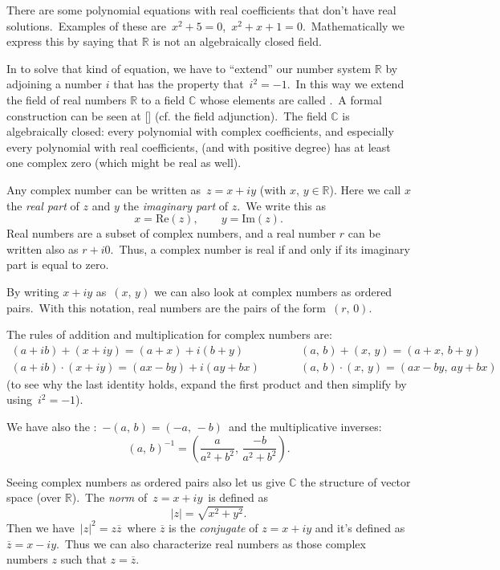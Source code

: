 \documentclass[12pt]{article}
\begin{document}


There are some polynomial equations with real coefficients that don't have real solutions.\, Examples of these are\, $x^2+5=0$,\, $x^2+x+1=0$.\, Mathematically we express this by saying that $\mathbb{R}$ is not an algebraically closed field.

In  to solve that kind of equation, we have to ``extend'' our number system $\mathbb{R}$ by adjoining a number $i$ that has the property that\, $i^2=-1$.\, In this way we extend the field of real numbers $\mathbb{R}$ to a field $\mathbb{C}$ whose elements are called \emph{}.\, A formal construction can be seen at [] (cf. the field adjunction).\, The field $\mathbb{C}$ is algebraically closed: every polynomial with complex coefficients, and especially every polynomial with real coefficients, (and with positive degree) has at least one complex zero (which might be real as well).

Any complex number can be written as\, $z = x+iy$ (with $x,\,y\in\mathbb{R}$). Here we call $x$ the {\em real part}  of $z$ and $y$ the {\em imaginary part} of $z$.\,
We write this as 
$$x=\mbox{Re}(z), \qquad y=\mbox{Im}(z).$$
Real numbers are a subset of complex numbers, and a real number $r$ can be written also as $r+i0$.\, Thus, a complex number is real if and only if its imaginary part is equal to zero.

By writing $x\!+\!iy$ as\, $(x,\,y)$ we can also look at complex numbers as ordered pairs.\, With this notation, real numbers are the pairs of the form\, $(r,\,0)$. 

The rules of addition and multiplication for complex numbers are:
\begin{eqnarray*}
(a+ib)+(x+iy)=(a+x)+i(b+y)&\qquad&(a,\,b)+(x,\,y) = (a+x,\,b+y)\\
(a+ib)\cdot(x+iy)=(ax-by)+i(ay+bx)&\qquad&(a,\,b)\cdot(x,\,y)=(ax-by,\,ay+bx)
\end{eqnarray*}
(to see why the last identity holds, expand the first product and then simplify 
by using\, $i^2 = -1$).

We have also the :\, $-(a,\,b) =
(-a,\,-b)$\, and the multiplicative inverses:
$$(a,\,b)^{-1}=\left(\frac{a}{a^2+b^2},\,\frac{-b}{a^2+b^2}\right).$$

Seeing complex numbers as ordered pairs also let us give $\mathbb{C}$ the structure of vector space (over $\mathbb{R}$).\, The \emph{norm} of\, $z = x+iy$\, is defined as
$$|z| = \sqrt{x^2+y^2}.$$
Then we have\, $|z|^2=z\overline{z}$\, where $\overline{z}$ is the \emph{conjugate} of $z = x+iy$ and it's defined as\, $\overline{z} = x-iy$.\, Thus we can also characterize real numbers as those complex numbers $z$ such that $z=\overline{z}$.
\end{document}
